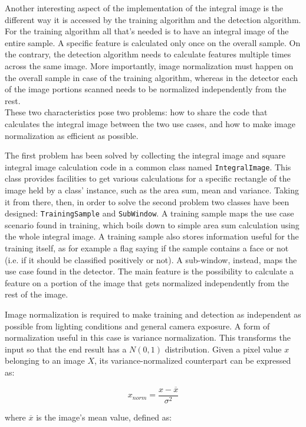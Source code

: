 \documentclass[a4paper,11pt,titlepage]{article}
\begin{document}
Another interesting aspect of the implementation of the integral image is the
different way it is accessed by the training algorithm and the detection
algorithm. For the training algorithm all that's needed is to have an integral
image of the entire sample. A specific feature is calculated only once on the
overall sample. On the contrary, the detection algorithm needs to calculate
features multiple times across the same image. More importantly, image
normalization must happen on the overall sample in case of the training
algorithm, whereas in the detector each of the image portions scanned needs to
be normalized independently from the rest. \\
These two characteristics pose two problems: how to share the code that
calculates the integral image between the two use cases, and how to make image
normalization as efficient as possible.

The first problem has been solved by collecting the integral image and square
integral image calculation code in a common class named \texttt{IntegralImage}.
This class provides facilities to get various calculations for a specific
rectangle of the image held by a class' instance, such as the area sum, mean and
variance.  Taking it from there, then, in order to solve the second problem two
classes have been designed: \texttt{TrainingSample} and \texttt{SubWindow}. A
training sample maps the use case scenario found in training, which boils down
to simple area sum calculation using the whole integral image. A training sample
also stores information useful for the training itself, as for example a flag
saying if the sample contains a face or not (i.e. if it should be classified
positively or not). A sub-window, instead, maps the use case found in the
detector. The main feature is the possibility to calculate a feature on a
portion of the image that gets normalized independently from the rest of the
image.

Image normalization is required to make training and detection as independent as
possible from lighting conditions and general camera exposure. A form of
normalization useful in this case is variance normalization. This transforms the
input so that the end result has a $N(0,1)$ distribution.
Given a pixel value $x$ belonging to an image $X$, its variance-normalized
counterpart can be expressed as:

\[ x_{norm} = \dfrac{x - \overline{x}}{\sigma^{2}} \]

where $\overline{x}$ is the image's mean value, defined as:
\end{document}
